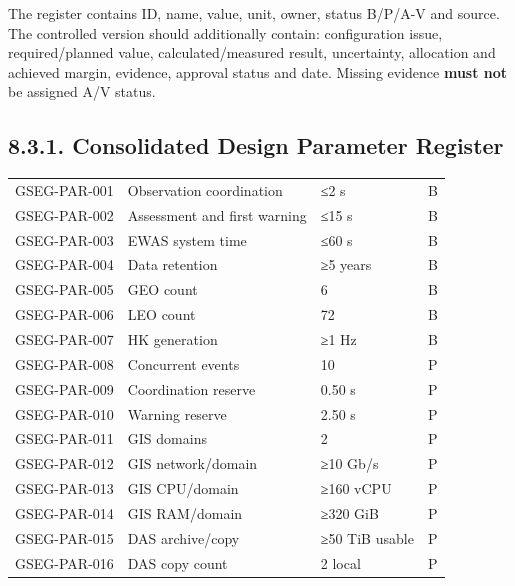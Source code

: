 The register contains ID, name, value, unit, owner, status B/\allowbreak{}P/\allowbreak{}A-V and source. The controlled version should additionally contain: configuration issue, required/\allowbreak{}planned value, calculated/\allowbreak{}measured result, uncertainty, allocation and achieved margin, evidence, approval status and date. Missing evidence \textbf{must not} be assigned A/\allowbreak{}V status.

\subsection{8.3.1. Consolidated Design Parameter Register}\label{ddf-8-3-1}

\begingroup{}
\begin{longtable}{|P{0.24}|P{0.40}|P{0.24}|P{0.12}|}
\hline{}
 &  &  & \\ \hline
\endhead
\hline\endlastfoot
GSEG-PAR-001 & Observation coordination & ≤2 s & B\\ \hline
GSEG-PAR-002 & Assessment and first warning & ≤15 s & B\\ \hline
GSEG-PAR-003 & EWAS system time & ≤60 s & B\\ \hline
GSEG-PAR-004 & Data retention & ≥5 years & B\\ \hline
GSEG-PAR-005 & GEO count & 6 & B\\ \hline
GSEG-PAR-006 & LEO count & 72 & B\\ \hline
GSEG-PAR-007 & HK generation & ≥1 Hz & B\\ \hline
GSEG-PAR-008 & Concurrent events & 10 & P\\ \hline
GSEG-PAR-009 & Coordination reserve & 0.50 s & P\\ \hline
GSEG-PAR-010 & Warning reserve & 2.50 s & P\\ \hline
GSEG-PAR-011 & GIS domains & 2 & P\\ \hline
GSEG-PAR-012 & GIS network/\allowbreak{}domain & ≥10 Gb/\allowbreak{}s & P\\ \hline
GSEG-PAR-013 & GIS CPU/\allowbreak{}domain & ≥160 vCPU & P\\ \hline
GSEG-PAR-014 & GIS RAM/\allowbreak{}domain & ≥320 GiB & P\\ \hline
GSEG-PAR-015 & DAS archive/\allowbreak{}copy & ≥50 TiB usable & P\\ \hline
GSEG-PAR-016 & DAS copy count & 2 local & P\\ \hline

\end{longtable}
